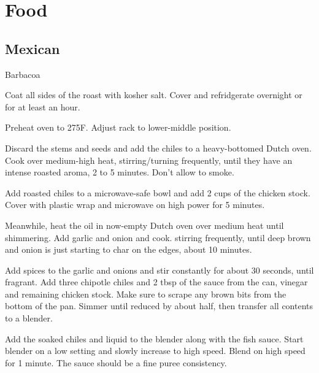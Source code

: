 \documentclass[]{article}
\begin{document}
\tableofcontents
\newpage


\section{Food}

\subsection{Mexican}

\begin{recipe}{Barbacoa}{}{}
	
	
	Coat all sides of the roast with kosher salt. Cover and refridgerate overnight or for
	at least an hour.
	
	\newstep
	Preheat oven to 275\0F. Adjust rack to lower-middle position.
	
	Discard the stems and seeds and add the chiles to a heavy-bottomed Dutch oven.
	Cook over medium-high heat, stirring/turning frequently, until they have an intense
	roasted aroma, 2 to 5 minutes. Don't allow to smoke.

	Add roasted chiles to a microwave-safe bowl and add 2 cups of the chicken stock.
	Cover with plastic wrap and microwave on high power for 5 minutes.

	Meanwhile, heat the oil in now-empty Dutch oven over medium heat until 
	shimmering. Add garlic and onion and cook. stirring frequently, until deep brown 
	and onion is just starting to char on the edges, about 10 minutes.

	Add spices to the garlic and onions and stir constantly for about 30 seconds, until fragrant.
	Add three chipotle chiles and 2 tbsp of the sauce from the can, vinegar and remaining chicken stock. Make sure to scrape any brown
	bits from the bottom of the pan. Simmer until reduced by about half, then transfer all contents to
	a blender.

	Add the soaked chiles and liquid to the blender along with the fish sauce. Start blender on a low
	setting and slowly increase to high speed. Blend on high speed for 1 minute. The sauce should be a fine
	puree consistency.


\end{recipe}
\end{document}
